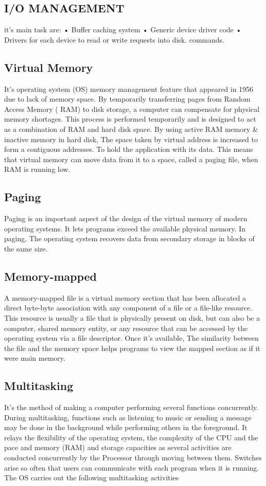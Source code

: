 \documentclass[preprint,12pt]{elsarticle}
\begin{document}
\subsection{I/O MANAGEMENT}
it's main task are:
• Buffer caching system
• Generic device driver code
• Drivers for each device to read or write requests into disk.
commands.\cite{6}

\subsection{Virtual Memory}
It's operating system (OS) memory management feature that appeared in 1956 due to lack of memory space. By temporarily transferring pages from Random Access Memory ( RAM) to disk storage, a computer can compensate for physical memory shortages. This process is performed temporarily and is designed to act as a combination of RAM and hard disk space. By using active RAM memory \& inactive memory in hard disk, The space taken by virtual address is increased to form a contiguous addresses. To hold the application with its data. 
This means that virtual memory can move data from it to a space, called a paging file, when RAM is running low.

\subsection{Paging}
Paging is an important aspect of the design of the virtual memory of modern operating systems. It lets programs exceed the available physical memory. In paging, The operating system recovers data from secondary storage in blocks of the same size.\cite{7}
\subsection{Memory-mapped}

A memory-mapped file is a virtual memory section that has been allocated a direct byte-byte association with any component of a file or a file-like resource. This resource is usually a file that is physically present on disk, but can also be a computer, shared memory entity, or any resource that can be accessed by the operating system via a file descriptor. Once it's available, The similarity between the file and the memory space helps programs to view the mapped section as if it were main memory.\cite{7}

\subsection{Multitasking}
It's the method of making a computer performing several functions concurrently. During multitasking, functions such as listening to music or sending a message may be done in the background while performing others in the foreground. It relays the flexibility of the operating system, the complexity of the CPU and the pace and memory (RAM) and storage capacities as several activities are conducted concurrently by the Processor through moving between them. Switches arise so often that users can communicate with each program when it is running. The OS carries out the following multitasking activities 
\end{document}

